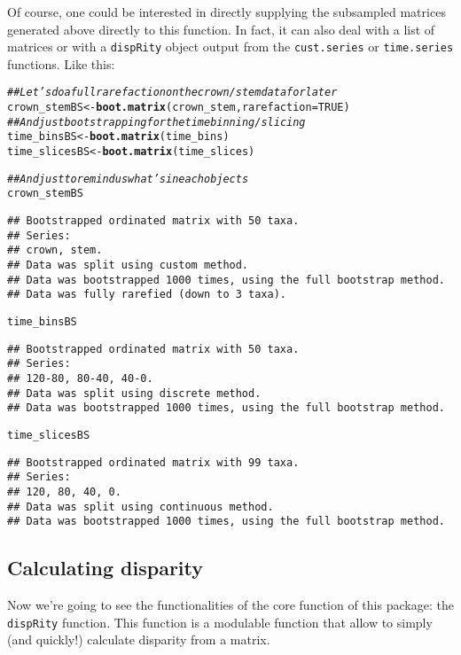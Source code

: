 \documentclass{article}\usepackage[]{graphicx}\usepackage[]{color}
\makeatletter
\newcommand{\hlnum}[1]{\textcolor[rgb]{0.686,0.059,0.569}{#1}}%
\newcommand{\hlcom}[1]{\textcolor[rgb]{0.678,0.584,0.686}{\textit{#1}}}%
\newcommand{\hlstd}[1]{\textcolor[rgb]{0.345,0.345,0.345}{#1}}%
\newcommand{\hlkwb}[1]{\textcolor[rgb]{0.69,0.353,0.396}{#1}}%
\newcommand{\hlkwc}[1]{\textcolor[rgb]{0.333,0.667,0.333}{#1}}%
\newcommand{\hlkwd}[1]{\textcolor[rgb]{0.737,0.353,0.396}{\textbf{#1}}}%
\newenvironment{kframe}{%
 \def\at@end@of@kframe{}%
 \ifinner\ifhmode%
  \def\at@end@of@kframe{\end{minipage}}%
  \begin{minipage}{\columnwidth}%
 \fi\fi%
 \def\FrameCommand##1{\hskip\@totalleftmargin \hskip-\fboxsep
 \colorbox{shadecolor}{##1}\hskip-\fboxsep
     \hskip-\linewidth \hskip-\@totalleftmargin \hskip\columnwidth}%
 \MakeFramed {\advance\hsize-\width
   \@totalleftmargin\z@ \linewidth\hsize
   \@setminipage}}%
 {\par\unskip\endMakeFramed%
 \at@end@of@kframe}
\newenvironment{knitrout}{}{} %
\newcommand{\dispRity}{\texttt{dispRity} }
\makeatother
\begin{document}
Of course, one could be interested in directly supplying the subsampled matrices generated above directly to this function.
In fact, it can also deal with a list of matrices or with a \dispRity object output from the \texttt{cust.series} or \texttt{time.series} functions.
Like this:

\begin{knitrout}
\color{fgcolor}\begin{kframe}
\begin{alltt}
\hlcom{## Let's do a full rarefaction on the crown/stem data for later}
\hlstd{crown_stemBS} \hlkwb{<-} \hlkwd{boot.matrix}\hlstd{(crown_stem,} \hlkwc{rarefaction} \hlstd{=} \hlnum{TRUE}\hlstd{)}
\hlcom{## And just bootstrapping for the time binning/slicing}
\hlstd{time_binsBS} \hlkwb{<-} \hlkwd{boot.matrix}\hlstd{(time_bins)}
\hlstd{time_slicesBS} \hlkwb{<-} \hlkwd{boot.matrix}\hlstd{(time_slices)}

\hlcom{## And just to remind us what's in each objects}
\hlstd{crown_stemBS}
\end{alltt}
\begin{verbatim}
## Bootstrapped ordinated matrix with 50 taxa. 
## Series:
## crown, stem.
## Data was split using custom method.
## Data was bootstrapped 1000 times, using the full bootstrap method.
## Data was fully rarefied (down to 3 taxa).
\end{verbatim}
\begin{alltt}
\hlstd{time_binsBS}
\end{alltt}
\begin{verbatim}
## Bootstrapped ordinated matrix with 50 taxa. 
## Series:
## 120-80, 80-40, 40-0.
## Data was split using discrete method.
## Data was bootstrapped 1000 times, using the full bootstrap method.
\end{verbatim}
\begin{alltt}
\hlstd{time_slicesBS}
\end{alltt}
\begin{verbatim}
## Bootstrapped ordinated matrix with 99 taxa. 
## Series:
## 120, 80, 40, 0.
## Data was split using continuous method.
## Data was bootstrapped 1000 times, using the full bootstrap method.
\end{verbatim}
\end{kframe}
\end{knitrout}

\subsection{Calculating disparity}
Now we're going to see the functionalities of the core function of this package: the \dispRity function.
This function is a modulable function that allow to simply (and quickly!) calculate disparity from a matrix.
\end{document}
